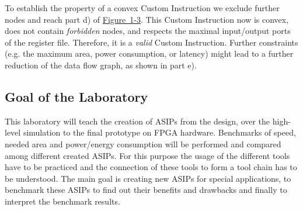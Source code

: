 \documentclass[
]{article}
\begin{document}
To establish the property of a convex Custom Instruction we exclude
further nodes and reach part d) of
\protect\hyperlink{Fig13}{Figure~1-3}. This Custom Instruction now is
convex, does not contain \emph{forbidden} nodes, and respects the
maximal input/output ports of the register file. Therefore, it is a
\emph{valid} Custom Instruction. Further constraints (e.g. the maximum
area, power consumption, or latency) might lead to a further reduction
of the data flow graph, as shown in part e).

\hypertarget{goal-of-the-laboratory}{%
\subsection{Goal of the Laboratory}\label{goal-of-the-laboratory}}

This laboratory will teach the creation of ASIPs from the design, over
the high-level simulation to the final prototype on FPGA hardware.
Benchmarks of speed, needed area and power/energy consumption will be
performed and compared among different created ASIPs. For this purpose
the usage of the different tools have to be practiced and the connection
of these tools to form a tool chain has to be understood. The main goal
is creating new ASIPs for special applications, to benchmark these ASIPs
to find out their benefits and drawbacks and finally to interpret the
benchmark results.
\end{document}
